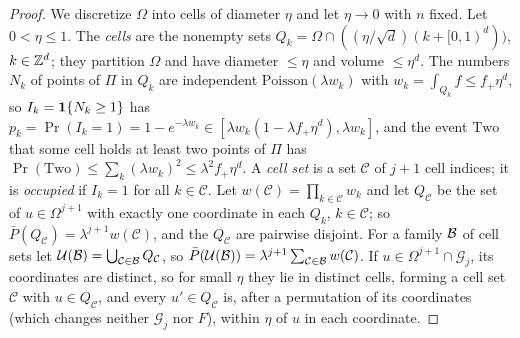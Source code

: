 \documentclass[11pt]{article}
\begin{document}
\begin{proof}
We discretize $\Omega$ into cells of diameter $\eta$ and let $\eta\to0$ with $n$ fixed. Let $0<\eta\le1$. The \emph{cells} are the
nonempty sets $Q_k = \Omega \cap ((\eta/\sqrt d)(k+[0,1)^d))$, $k\in\mathbb{Z}^d$; they partition $\Omega$ and have diameter $\le\eta$ and volume
$\le\eta^d$. The numbers $N_k$ of points of $\Pi$ in $Q_k$ are independent $\mathrm{Poisson}(\lambda w_k)$ with $w_k=\int_{Q_k}f\le f_+\eta^d$, so
$I_k = \mathbf{1}\{N_k \ge 1\}$ has $p_k = \Pr(I_k = 1)=1-e^{-\lambda w_k}\in[\lambda w_k(1 - \lambda f_+\eta^d),\lambda w_k]$, and the event $\mathrm{Two}$
that some cell holds at least two points of $\Pi$ has $\Pr(\mathrm{Two}) \le\sum_k(\lambda w_k)^2\le \lambda^2f_+\eta^d$. A \emph{cell set}
is a set $\mathcal C$ of $j+1$ cell indices; it is \emph{occupied} if $I_k=1$ for all $k\in\mathcal C$. Let $w(\mathcal C)=\prod_{k\in\mathcal C}w_k$ and
let $Q_{\mathcal C}$ be the set of $u\in\Omega^{j+1}$ with exactly one coordinate in each $Q_k$, $k\in\mathcal C$; so $\bar P(Q_{\mathcal C})=\lambda^{j+1}w(\mathcal C)$, and
the $Q_{\mathcal C}$ are pairwise disjoint. For a family $\mathcal{B}$ of cell sets let $\mathcal U(\mathcal{B})=\bigcup_{\mathcal C\in\mathcal{B}}Q_{\mathcal C}$, so
$\bar P(\mathcal U(\mathcal{B}))=\lambda^{j+1}\sum_{\mathcal C\in\mathcal{B}}w(\mathcal C)$. If $u\in\Omega^{j+1}\cap\mathcal G_j$, its coordinates are distinct, so for small
$\eta$ they lie in distinct cells, forming a cell set $\mathcal C$ with $u\in Q_{\mathcal C}$, and every $u'\in Q_{\mathcal C}$ is, after a permutation of
its coordinates (which changes neither $\mathcal G_j$ nor $F$), within $\eta$ of $u$ in each coordinate.


\end{proof}
\end{document}
